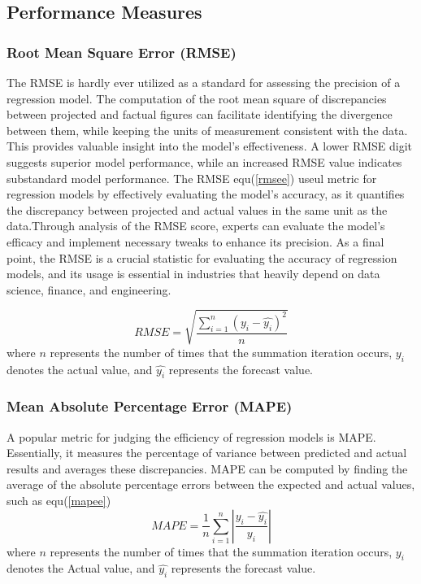 \documentclass[a4paper,fleqn]{cas-sc}
\begin{document}
\subsection{ Performance Measures}
\subsubsection{Root Mean Square Error (RMSE) }
The RMSE is hardly ever utilized as a standard for assessing the precision of a regression model. The computation of the root mean square of discrepancies between projected and factual figures can facilitate identifying the divergence between them, while keeping the units of measurement consistent with the data. This provides valuable insight into the model's effectiveness. A lower RMSE digit suggests superior model performance, while an increased RMSE value indicates substandard model performance. The RMSE equ(\ref{rmsee}) useul metric for regression models by effectively evaluating the model's accuracy, as it quantifies the discrepancy between projected and actual values in the same unit as the data.Through analysis of the RMSE score, experts can evaluate the model's efficacy and implement necessary tweaks to enhance its precision. As a final point, the RMSE is a crucial statistic for evaluating the accuracy of regression models, and its usage is essential in industries that heavily depend on data science, finance, and engineering.



\begin{equation} \label{rmsee}
RMSE=\sqrt{\frac{\sum_{i=1}^{n}(y_{i}-\hat{y_{i}})^2}{n}}
\end{equation}
where $n$ represents the number of times that the summation iteration occurs, \begin{math} y_{i} \end{math} denotes the actual value, and \begin{math}\hat{y_{i}}\end{math} represents the forecast value.




\subsubsection{ Mean Absolute Percentage Error (MAPE)}
A popular metric for judging the efficiency of regression models is MAPE. Essentially, it measures the percentage of variance between predicted and actual results and averages these discrepancies. MAPE can be computed by finding the average of the absolute percentage errors between the expected and actual values, such as equ(\ref{mapee})
\begin{equation} \label{mapee}
MAPE=\frac{1}{n}\sum_{i=1}^{n} \left | \frac{y_{i}-\hat{y_{i}}}{y_{i}} \right |
\end{equation}
where $n$ represents the number of times that the summation iteration occurs, \begin{math} y_{i} \end{math} denotes the Actual value, and \begin{math}\hat{y_{i}}\end{math} represents the forecast value.
\end{document}
